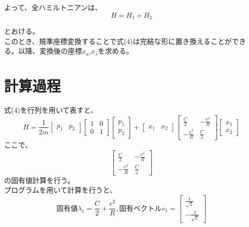 \documentclass{jsarticle}
\begin{document}
	よって、全ハミルトニアンは、
		\begin{equation}
			H=H_{1}+H_{2}
		\end{equation}

	とおける。\\
	このとき、規準座標変換することで式(4)は完結な形に置き換えることができる。以降、変換後の座標$x_a$,$x_s$を求める。

	\section{計算過程}
	式(4)を行列を用いて表すと、
	\begin{equation}
		H=\frac{1}{2m}
		\begin{bmatrix}
		p_1 & p_2
		\end{bmatrix}
		\begin{bmatrix}
			1 & 0 \\
			0 & 1
		\end{bmatrix}
		\begin{bmatrix}
			p_1 \\
			p_2
		\end{bmatrix}
		+
		\begin{bmatrix}
		x_1 & x_2
		\end{bmatrix}
		\begin{bmatrix}
		\frac{C}{2} & -\frac{e^{2}}{R} \\
		-\frac{e^{2}}{R} & \frac{C}{2}
		\end{bmatrix}
		\begin{bmatrix}
		x_1 \\
		x_2
		\end{bmatrix}
	\end{equation}
	ここで、
	\begin{equation}
	\begin{bmatrix}
	\frac{C}{2} & -\frac{e^{2}}{R} \\
	-\frac{e^{2}}{R} & \frac{C}{2}
	\end{bmatrix}
	\end{equation}
	の固有値計算を行う。\\
	プログラムを用いて計算を行うと、
	\begin{equation}
	固有値 \lambda_1 = \frac{C}{2}+\frac{e^{2}}{R},
	固有ベクトル v_1=
	\begin{bmatrix}
	\frac{1}{\sqrt{2}} \\
	-\frac{1}{\sqrt{2}}
	\end{bmatrix}
	\end{equation}
\end{document}
